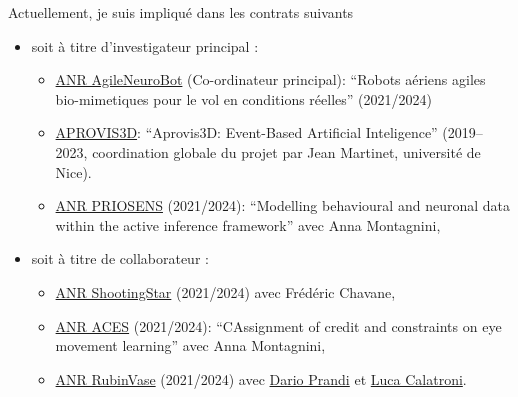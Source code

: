 \documentclass[10pt,french,a4paper,twoside]{article}%
\begin{document}
Actuellement, je suis impliqué dans les contrats suivants
\begin{itemize}
\item soit à titre d'investigateur principal :
\begin{itemize}
	\item  \href{https://laurentperrinet.github.io/grant/anr-anr/}{ANR AgileNeuroBot} (Co-ordinateur principal): ``Robots aériens agiles bio-mimetiques pour le vol en conditions réelles'' (2021/2024)
	\item  \href{https://laurentperrinet.github.io/grant/aprovis-3-d/}{APROVIS3D}: ``Aprovis3D: Event-Based Artificial Inteligence'' (2019--2023, coordination globale du projet par Jean Martinet, université de Nice).
 	\item \href{https://laurentperrinet.github.io/grant/anr-priosens/}{ANR PRIOSENS} (2021/2024): ``Modelling behavioural and neuronal data within the active inference framework'' avec Anna Montagnini,
\end{itemize}
\item soit à titre de collaborateur :

\begin{itemize}
 \item \href{https://laurentperrinet.github.io/grant/anr-shootingstar/}{ANR ShootingStar} (2021/2024) avec Frédéric Chavane,
 \item \href{https://laurentperrinet.github.io/grant/anr-aces/}{ANR ACES} (2021/2024): ``CAssignment of credit and constraints on eye movement learning'' avec Anna Montagnini,
 \item \href{https://laurentperrinet.github.io/grant/anr-predicteye/}{ANR RubinVase} (2021/2024) avec \href{https://scholar.google.com/citations?user=22p8Wc4AAAAJ}{Dario Prandi} et \href{https://scholar.google.com/citations?user=dRVPKmkAAAAJ}{Luca Calatroni}.
\end{itemize}


\end{itemize}
\end{document}
